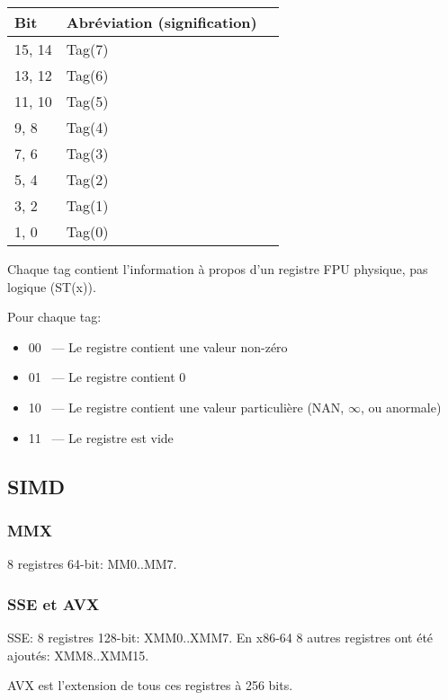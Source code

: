 \begin{center}
\begin{tabular}{ | l | l | l | }
\hline
Bit & Abréviation (signification) \\
\hline
15, 14 & Tag(7) \\
\hline
13, 12 & Tag(6) \\
\hline
11, 10 & Tag(5) \\
\hline
9, 8 & Tag(4) \\
\hline
7, 6 & Tag(3) \\
\hline
5, 4 & Tag(2) \\
\hline
3, 2 & Tag(1) \\
\hline
1, 0 & Tag(0) \\
\hline
\end{tabular}
\end{center}

Chaque tag contient l'information à propos d'un registre FPU physique, pas logique (ST(x)).

Pour chaque tag:

\begin{itemize}
\item 00 ~--- Le registre contient une valeur non-zéro
\item 01 ~--- Le registre contient 0
\item 10 ~--- Le registre contient une valeur particulière (\ac{NAN}, $\infty$, ou anormale)
\item 11 ~--- Le registre est vide
\end{itemize}

\subsection{\registers{} SIMD}

\subsubsection{\registers{} MMX}

8 registres 64-bit: MM0..MM7.

\subsubsection{\registers{} SSE et AVX}

SSE: 8 registres 128-bit: XMM0..XMM7.
En x86-64 8 autres registres ont été ajoutés: XMM8..XMM15.

AVX est l'extension de tous ces registres à 256 bits.



